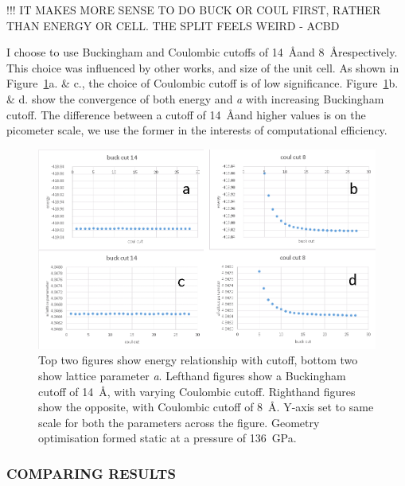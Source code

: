 !!! IT MAKES MORE SENSE TO DO BUCK OR COUL FIRST, RATHER THAN ENERGY OR CELL. THE SPLIT FEELS WEIRD - ACBD

I choose to use Buckingham and Coulombic cutoffs of 14~\AA and 8~\AA respectively. This choice was influenced by other works, and size of the \bdg unit cell. As shown in Figure~\ref{fig:buck_cutoff}a. \& c., the choice of Coulombic cutoff is of low significance. Figure~\ref{fig:buck_cutoff}b. \& d. show the convergence of both energy and \textit{a} with increasing Buckingham cutoff. The difference between a cutoff of 14~\AA and higher values is on the picometer scale, we use the former in the interests of computational efficiency.

\begin{figure}[h!]
  \includegraphics[width=\linewidth]{Figures/buck_cutoff_justification.png}
  \caption[BUCK CUTOFF]{Top two figures show energy relationship with cutoff, bottom two show lattice parameter \textit{a}. Lefthand figures show a Buckingham cutoff of 14~\AA, with varying Coulombic cutoff. Righthand figures show the opposite, with Coulombic cutoff of 8~\AA. Y-axis set to same scale for both the parameters across the figure. Geometry optimisation formed static at a pressure of 136~GPa.}
  \label{fig:buck_cutoff}
\end{figure}

\subsubsection{COMPARING RESULTS}

